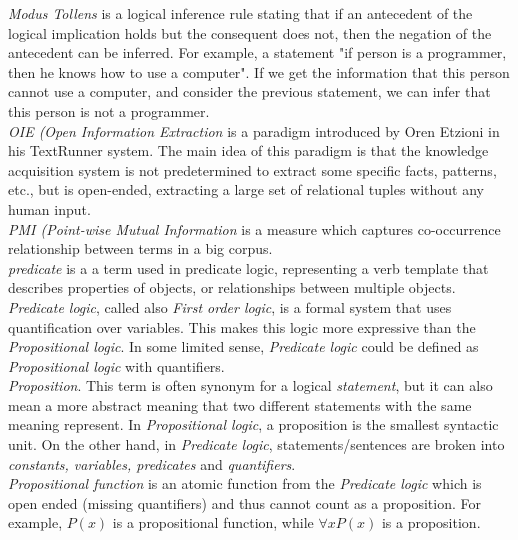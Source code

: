 \emph{Modus Tollens} is a logical inference rule stating that if an antecedent
of the logical implication holds but the consequent does not, then the negation
of the antecedent can be inferred. For example, a statement "if person is a 
programmer, then he knows how to use a computer". If we get the information
that this person cannot use a computer, and consider the previous statement, we
can infer that this person is not a programmer. \\

\emph{OIE (Open Information Extraction} is a paradigm introduced by Oren Etzioni
in his TextRunner system. The main idea of this paradigm is that the knowledge 
acquisition system is not predetermined to extract some specific facts, 
patterns, etc., but is open-ended, extracting a large set of relational tuples 
without any human input.\\

\emph{PMI (Point-wise Mutual Information} is a measure which captures 
co-occurrence relationship between terms in a big corpus.\\

\emph{predicate} is a a term used in predicate logic, representing a verb
template that describes properties of objects, or relationships between multiple
objects.\\

\emph{Predicate logic}, called also \emph{First order logic}, is a formal system
that uses quantification over variables. This makes this logic more expressive
than the \emph{Propositional logic}. In some limited sense, 
\emph{Predicate logic} could be defined as \emph{Propositional logic} with 
quantifiers.\\

\emph{Proposition}. This term is often synonym for a logical \emph{statement},
but it can also mean a more abstract meaning that two different statements with the
same meaning represent. In \emph{Propositional logic}, a proposition is the
smallest syntactic unit. On the other hand, in \emph{Predicate logic}, 
statements/sentences are broken into \emph{constants, variables, predicates}
and \emph{quantifiers}.\\

\emph{Propositional function} is an atomic function from the 
\emph{Predicate logic} which is open ended (missing quantifiers) and thus
cannot count as a proposition. For example, $P(x)$ is a propositional function,
while $\forall x P(x)$ is a proposition.\\

